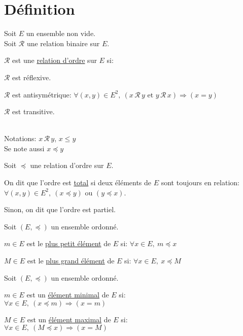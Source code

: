 \documentclass[12pt,twoside,a4paper]{article}
\author{MPSI 2}
\begin{document}
	\maketitle
	\section{D\'efinition}
		Soit $E$ un ensemble non vide.\\
		Soit $\mathcal{R}$ une relation binaire sur $E$.
		\begin{defi}
			$\mathcal{R}$ est une \underline{relation d'ordre} sur $E$ si:
			\begin{liste}
				\item $\mathcal{R}$ est r\'eflexive.
				\item $\mathcal{R}$ est antisym\'etrique: $\forall(x,y)\in E^2,\ (x\,\mathcal{R}\,y \text{ et }y\,\mathcal{R}\,x)\Rightarrow(x=y)$
				\item $\mathcal{R}$ est transitive.
			\end{liste}
		\end{defi}\ \\
		Notations: $x\,\mathcal{R}\,y$, $x\leq y$\\
		Se note aussi $x\preccurlyeq y$\\
		\begin{defi}
			Soit $\preccurlyeq$ une relation d'ordre sur $E$.\\
			\begin{liste}
				\item On dit que l'ordre est \underline{total} si deux \'el\'ements de $E$ sont toujours en relation:\\
					$\forall(x,y)\in E^2,\ (x\preccurlyeq y)$ ou $(y\preccurlyeq x)$.
				\item Sinon, on dit que l'ordre est partiel.
			\end{liste}
		\end{defi}
		\begin{defi}
			Soit $(E,\preccurlyeq)$ un ensemble ordonn\'e.
			\begin{liste}
				\item $m\in E$ est le \underline{plus petit \'el\'ement} de $E$ si: $\forall x\in E,\ m\preccurlyeq x$
				\item $M\in E$ est le \underline{plus grand \'el\'ement} de $E$ si: $\forall x\in E,\ x\preccurlyeq M$
			\end{liste}
		\end{defi}
		\begin{defi}
		Soit $(E,\preccurlyeq)$ un ensemble ordonn\'e.
			\begin{liste}
				\item $m\in E$ est un \underline{\'el\'ement minimal} de $E$ si:\\
					$\forall x\in E,\ (x \preccurlyeq m)\Rightarrow (x=m)$
				\item $M\in E$ est un \underline{\'el\'ement maximal} de $E$ si:\\
					$\forall x\in E,\ (M\preccurlyeq x)\Rightarrow (x=M)$
			\end{liste}
		\end{defi}
\end{document}

